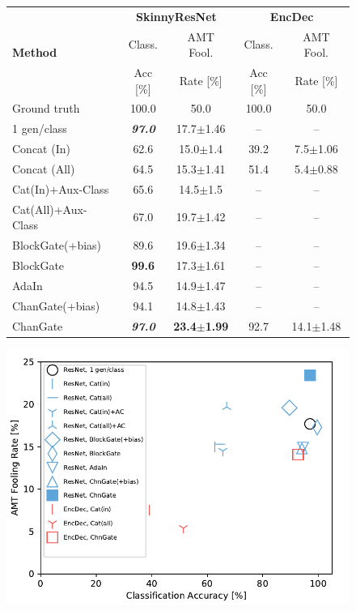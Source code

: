\begin{figure}[ht!]
  \centering
  \begin{minipage}[t]{0.49\linewidth}  
  \centering
  \resizebox{1.\linewidth}{!} {
  \setlength{\tabcolsep}{6pt}
  \begin{tabular}{l c c c c}
  \toprule
    \multirow{3}{*}{\textbf{Method}} & \multicolumn{2}{c}{ {\bf SkinnyResNet}} & \multicolumn{2}{c}{ {\bf EncDec}} \\ \cmidrule(l){2-3} \cmidrule(l){4-5}
	& Class. & AMT Fool. & Class. & AMT Fool. \\
	& Acc [\%] & Rate [\%] & Acc [\%] & Rate [\%] \\ \midrule
    Ground truth & 100.0 & 50.0 & 100.0 & 50.0 \\ \midrule
    1 gen/class & \textbf{\textit{97.0}} & 17.7$\pm$1.46 & -- & -- \\ \midrule
    Concat (In)	& 62.6 & 15.0$\pm$1.4 & 39.2 & 7.5$\pm$1.06 \\ 
    Concat (All) & 64.5 & 15.3$\pm$1.41 & 51.4 & 5.4$\pm$0.88 \\ \midrule
    Cat(In)+Aux-Class & 65.6 & 14.5$\pm$1.5 & -- & -- \\ 
    Cat(All)+Aux-Class & 67.0 & 19.7$\pm$1.42 & -- & --\\ \midrule
    BlockGate(+bias) & 89.6 & 19.6$\pm$1.34 & -- & --\\ 
    BlockGate & {\bf 99.6} & 17.3$\pm$1.61 & -- & --\\ 
    AdaIn & 94.5 & 14.9$\pm$1.47 & -- & --\\ 
    ChanGate(+bias) & 94.1 & 14.8$\pm$1.43 & -- & --\\ 
    ChanGate & \textbf{\textit{97.0}} & {\bf 23.4$\pm$1.99} & 92.7 & 14.1$\pm$1.48 \\ 
	\hline
	\end{tabular} } 
  \end{minipage}\begin{minipage}[]{0.49\linewidth}
  \centering
  \includegraphics[width=1.\linewidth]{paper_images/gen_real_vs_acc.pdf} 

\end{minipage}
\end{figure}
